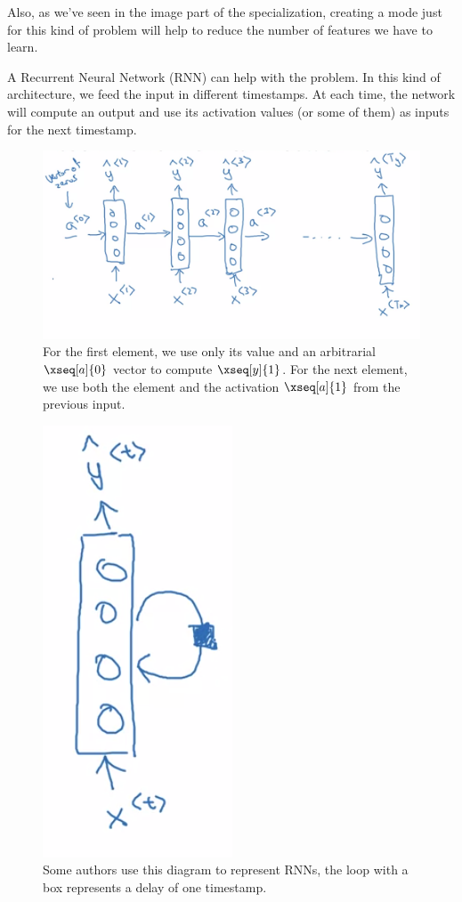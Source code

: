 \documentclass[12pt, a4paper, oneside]{book}
\begin{document}
Also, as we've seen in the image part of the specialization, creating a mode
just for this kind of problem will help to reduce the number of features we have
to learn.

A Recurrent Neural Network (RNN) can help with the problem. In this kind of
architecture, we feed the input in different timestamps. At each time, the
network will compute an output and use its activation values (or some of them)
as inputs for the next timestamp.

\begin{figure}[h]
\centering
\includegraphics[scale=0.45]{Res/RNN_basic.png}
\caption{For the first element, we use only its value and an arbitrarial
$\xseq[a]{0}$ vector to compute $\xseq[y]{1}$. For the next element, we use both the
element and the activation $\xseq[a]{1}$ from the previous input.}
\label{RNN_basic.png}
\end{figure}

\begin{figure}[h]
\centering
\includegraphics[scale=0.5]{Res/RNN_representation.png}
\caption{Some authors use this diagram to represent RNNs, the loop with a box
represents a delay of one timestamp.}
\label{RNN_representation.png}
\end{figure}
\end{document}
